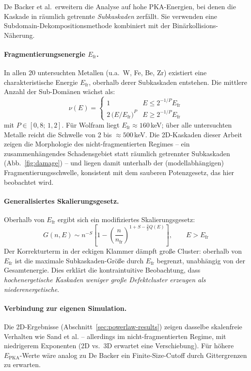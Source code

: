 \documentclass[11pt,a4paper]{article}
\begin{document}
De Backer et al.\ erweitern die Analyse auf hohe PKA-Energien, bei denen
die Kaskade in räumlich getrennte \emph{Subkaskaden} zerfällt. Sie verwenden
eine Subdomain-Dekompositionsmethode kombiniert mit der Binärkollisions-Näherung.

\paragraph{Fragmentierungsenergie $E_\text{fr}$.}
In allen 20 untersuchten Metallen (u.a.\ W, Fe, Be, Zr) existiert eine
charakteristische Energie $E_\text{fr}$, oberhalb derer Subkaskaden entstehen.
Die mittlere Anzahl der Sub-Domänen wächst als:
\begin{equation}
\nu(E) = \begin{cases}
1 & E \leq 2^{-1/P} E_\text{fr} \\
2\,\bigl(E/E_\text{fr}\bigr)^P & E \geq 2^{-1/P} E_\text{fr}
\end{cases}
\label{eq:subkaskaden}
\end{equation}
mit $P \in [0{,}8;\,1{,}2]$. Für Wolfram liegt $E_\text{fr} \approx 160$\,keV;
über alle untersuchten Metalle reicht die Schwelle von 2 bis
$\approx 500$\,keV. Die 2D-Kaskaden dieser Arbeit zeigen die Morphologie des
nicht-fragmentierten Regimes -- ein zusammenhängendes Schadensgebiet statt
räumlich getrennter Subkaskaden (Abb.~\ref{fig:damage}) -- und liegen damit
unterhalb der (modellabhängigen) Fragmentierungsschwelle, konsistent mit dem
sauberen Potenzgesetz, das hier beobachtet wird.

\paragraph{Generalisiertes Skalierungsgesetz.}
Oberhalb von $E_\text{fr}$ ergibt sich ein modifiziertes Skalierungsgesetz:
\begin{equation}
G(n, E) \sim n^{-S}\!\left[1 - \left(\frac{n}{n_\text{fr}}\right)^{1+S-\frac{3}{2}Q(E)}\right],
\qquad E > E_\text{fr}
\label{eq:debacker}
\end{equation}
Der Korrekturterm in der eckigen Klammer dämpft große Cluster: oberhalb
von $E_\text{fr}$ ist die maximale Subkaskaden-Größe durch $E_\text{fr}$
begrenzt, unabhängig von der Gesamtenergie. Dies erklärt die kontraintuitive
Beobachtung, dass \emph{hochenergetische Kaskaden weniger große Defektcluster
erzeugen als niederenergetische}.

\paragraph{Verbindung zur eigenen Simulation.}
Die 2D-Ergebnisse (Abschnitt~\ref{sec:powerlaw-results}) zeigen dasselbe
skalenfreie Verhalten wie Sand et al. -- allerdings im nicht-fragmentierten
Regime, mit niedrigerem Exponenten (2D vs.\ 3D erwartet eine Verschiebung).
Für höhere $E_\text{PKA}$-Werte wäre analog zu De Backer ein
Finite-Size-Cutoff durch Gittergrenzen zu erwarten.
\end{document}
